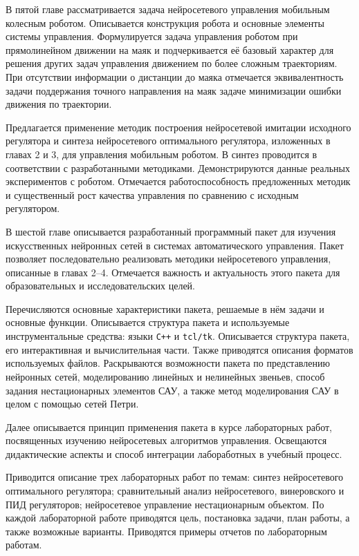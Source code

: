 
В пятой главе рассматривается задача нейросетевого управления
мобильным колесным роботом.  Описывается конструкция робота и основные
элементы системы управления.  Формулируется задача управления роботом
при прямолинейном движении на маяк и подчеркивается её базовый
характер для решения других задач управления движением по более
сложным траекториям.  При отсутствии информации о дистанции до маяка
отмечается эквивалентность задачи поддержания точного направления на
маяк задаче минимизации ошибки движения по траектории.

Предлагается применение методик построения нейросетевой имитации
исходного регулятора и синтеза нейросетевого оптимального регулятора,
изложенных в главах 2 и 3, для управления мобильным роботом.  В синтез
проводится в соответствии с разработанными методиками.
Демонстрируются данные реальных экспериментов с роботом.  Отмечается
работоспособность предложенных методик и существенный рост качества
управления по сравнению с исходным регулятором.


В шестой главе описывается разработанный программный пакет для
изучения искусственных нейронных сетей в системах автоматического
управления.  Пакет позволяет последовательно реализовать методики
нейросетевого управления, описанные в главах 2--4.  Отмечается
важность и актуальность этого пакета для образовательных и
исследовательских целей.

Перечисляются основные характеристики пакета, решаемые в нём задачи и
основные функции.  Описывается структура пакета и используемые
инструментальные средства: языки {\tt C++} и {\tt tcl/tk}.
Описывается структура пакета, его интерактивная и вычислительная
части.  Также приводятся описания форматов используемых файлов.
Раскрываются возможности пакета по представлению нейронных сетей,
моделированию линейных и нелинейных звеньев, способ задания
нестационарных элементов САУ, а также метод моделирования САУ в целом
с помощью сетей Петри.

Далее описывается принцип применения пакета в курсе лабораторных
работ, посвященных изучению нейросетевых алгоритмов управления.
Освещаются дидактические аспекты и способ интеграции лабоработных в
учебный процесс.

Приводится описание трех лабораторных работ по темам: синтез
нейросетевого оптимального регулятора; сравнительный анализ
нейросетевого, винеровского и ПИД регуляторов; нейросетевое управление
нестационарным объектом.  По каждой лабораторной работе приводятся
цель, постановка задачи, план работы, а также возможные варианты.
Приводятся примеры отчетов по лабораторным работам.

